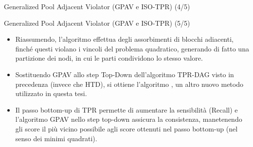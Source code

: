 \documentclass[9pt]{beamer}
\begin{document}
\begin{tframe}{Generalized Pool Adjacent Violator (GPAV e ISO-TPR) (4/5)}
\begin{center}
\end{center}
\end{tframe}
\begin{tframe}{Generalized Pool Adjacent Violator (GPAV e ISO-TPR) (5/5)}
\begin{itemize}
\item Riassumendo, l’algoritmo effettua degli assorbimenti di blocchi adiacenti, finché questi violano i vincoli del problema quadratico, generando di fatto una partizione dei nodi, in cui le parti condividono lo stesso valore.
\item Sostituendo GPAV allo step Top-Down dell'algoritmo TPR-DAG visto in precedenza (invece che HTD), si ottiene l'algoritmo , un altro nuovo metodo utilizzato in questa tesi.
\item Il passo bottom-up di TPR permette di aumentare la sensibilità (Recall) e l'algoritmo GPAV nello step top-down assicura la consistenza, manetenendo gli score il più vicino possibile agli score ottenuti nel passo bottom-up (nel senso dei minimi quadrati).
\end{itemize}
\end{tframe}
\end{document}

